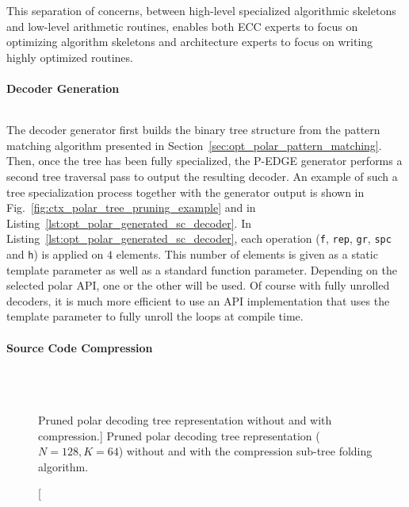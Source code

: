 This separation of concerns, between high-level specialized algorithmic
skeletons and low-level arithmetic routines, enables both ECC experts to focus
on optimizing algorithm skeletons and architecture experts to focus on writing
highly optimized routines.

\paragraph{Decoder Generation}

\begin{listing}[htp]
  \inputminted[frame=lines,linenos]{C++}{\curChapter/src/polar/generated_sc_decoder.cpp}
  \caption{The final code generated corresponding to the pruned tree in
    Fig.~\ref{fig:ctx_polar_tree_pruning_example}.}
  \label{lst:opt_polar_generated_sc_decoder}
\end{listing}

The decoder generator first builds the binary tree structure from the pattern
matching algorithm presented in Section~\ref{sec:opt_polar_pattern_matching}.
Then, once the tree has been fully specialized, the P-EDGE generator performs a
second tree traversal pass to output the resulting decoder. An example of such a
tree specialization process together with the generator output is shown in
Fig.~\ref{fig:ctx_polar_tree_pruning_example} and in
Listing~\ref{lst:opt_polar_generated_sc_decoder}. In
Listing~\ref{lst:opt_polar_generated_sc_decoder}, each operation (\verb|f|,
\verb|rep|, \verb|gr|, \verb|spc| and \verb|h|) is applied on $4$ elements. This
number of elements is given as a static template parameter as well as a standard
function parameter. Depending on the selected polar API, one or the other will
be used. Of course with fully unrolled decoders, it is much more efficient to
use an API implementation that uses the template parameter to fully unroll the
loops at compile time.

\paragraph{Source Code Compression}
\label{sec:opt_polar_sc_compression}

\begin{figure}[htp]
  \centering
  \\
  \\
  \caption
    [Pruned polar decoding tree representation without and with compression.]
    {Pruned polar decoding tree representation ($N = 128, K = 64$) without
    and with the compression sub-tree folding algorithm.}
  \label{fig:opt_polar_sc_gen_compression}
\end{figure}

